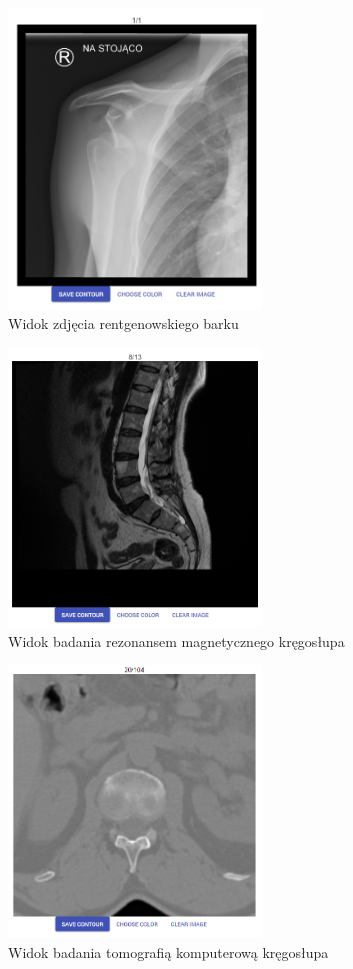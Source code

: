 \documentclass[a4paper,11pt,twoside,openright]{report}
\theoremstyle{definition}
\begin{document}
\begin{figure}[p]
	\center
	\includegraphics[width=0.6\textwidth]{113}
	\caption{Widok zdjęcia rentgenowskiego barku}
    	\label{fig:113}
\end{figure}

\begin{figure}[p]
	\center
	\includegraphics[width=0.6\textwidth]{114}
	\caption{Widok badania rezonansem magnetycznego kręgosłupa}
    	\label{fig:114}
\end{figure}

\begin{figure}[p]
	\center
	\includegraphics[width=0.6\textwidth]{115}
	\caption{Widok badania tomografią komputerową kręgosłupa}
    	\label{fig:115}
\end{figure}
\end{document}
